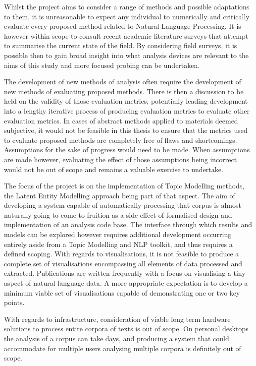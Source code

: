 \documentclass[10pt]{report}
\begin{document}
Whilst the project aims to consider a range of methods and possible adaptations to them, it is unreasonable to expect any individual to numerically and critically evaluate every proposed method related to Natural Language Processing. It is however within scope to consult recent academic literature surveys that attempt to summarise the current state of the field. By considering field surveys, it is possible then to gain broad insight into what analysis devices are relevant to the aims of this study and more focused probing can be undertaken.

The development of new methods of analysis often require the development of new methods of evaluating proposed methods. There is then a discussion to be held on the validity of those evaluation metrics, potentially leading development into a lengthy iterative process of producing evaluation metrics to evaluate other evaluation metrics. In cases of abstract methods applied to materials deemed subjective, it would not be feasible in this thesis to ensure that the metrics used to evaluate proposed methods are completely free of flaws and shortcomings. Assumptions for the sake of progress would need to be made. When assumptions are made however, evaluating the effect of those assumptions being incorrect would not be out of scope and remains a valuable exercise to undertake.

The focus of the project is on the implementation of Topic Modelling methods, the Latent Entity Modelling approach being part of that aspect. The aim of developing a system capable of automatically processing that corpus is almost naturally going to come to fruition as a side effect of formalised design and implementation of an analysis code base. The interface through which results and models can be explored however requires additional development occurring entirely aside from a Topic Modelling and NLP toolkit, and thus requires a defined scoping. With regards to visualisations, it is not feasible to produce a complete set of visualisations encompassing all elements of data processed and extracted. Publications are written frequently with a focus on visualising a tiny aspect of natural language data. A more appropriate expectation is to develop a minimum viable set of visualisations capable of demonstrating one or two key points.

With regards to infrastructure, consideration of viable long term hardware solutions to process entire corpora of texts is out of scope. On personal desktops the analysis of a corpus can take days, and producing a system that could accommodate for multiple users analysing multiple corpora is definitely out of scope.
\end{document}
